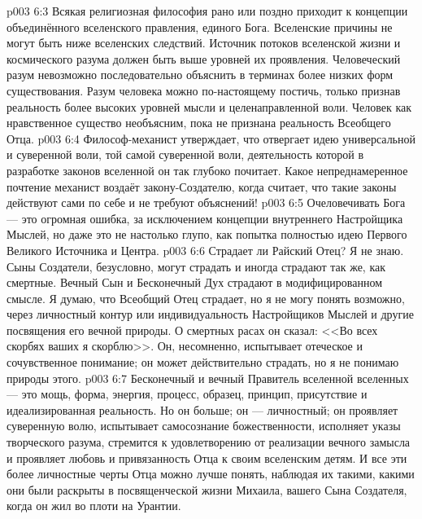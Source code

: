 \vs p003 6:3 \pc Всякая религиозная философия рано или поздно приходит к концепции объединённого вселенского правления, единого Бога. Вселенские причины не могут быть ниже вселенских следствий. Источник потоков вселенской жизни и космического разума должен быть выше уровней их проявления. Человеческий разум невозможно последовательно объяснить в терминах более низких форм существования. Разум человека можно по\hyp{}настоящему постичь, только признав реальность более высоких уровней мысли и целенаправленной воли. Человек как нравственное существо необъясним, пока не признана реальность Всеобщего Отца.
\vs p003 6:4 Философ\hyp{}механист утверждает, что отвергает идею универсальной и суверенной воли, той самой суверенной воли, деятельность которой в разработке законов вселенной он так глубоко почитает. Какое непреднамеренное почтение механист воздаёт закону\hyp{}Создателю, когда считает, что такие законы действуют сами по себе и не требуют объяснений!
\vs p003 6:5 Очеловечивать Бога --- это огромная ошибка, за исключением концепции внутреннего Настройщика Мыслей, но даже это не настолько глупо, как попытка полностью  идею Первого Великого Источника и Центра.
\vs p003 6:6 \pc Страдает ли Райский Отец? Я не знаю. Сыны Создатели, безусловно, могут страдать и иногда страдают так же, как смертные. Вечный Сын и Бесконечный Дух страдают в модифицированном смысле. Я думаю, что Всеобщий Отец страдает, но я не могу понять  возможно, через личностный контур или индивидуальность Настройщиков Мыслей и другие посвящения его вечной природы. О смертных расах он сказал: <<Во всех скорбях ваших я скорблю>>. Он, несомненно, испытывает отеческое и сочувственное понимание; он может действительно страдать, но я не понимаю природы этого.
\vs p003 6:7 \pc Бесконечный и вечный Правитель вселенной вселенных --- это мощь, форма, энергия, процесс, образец, принцип, присутствие и идеализированная реальность. Но он больше; он --- личностный; он проявляет суверенную волю, испытывает самосознание божественности, исполняет указы творческого разума, стремится к удовлетворению от реализации вечного замысла и проявляет любовь и привязанность Отца к своим вселенским детям. И все эти более личностные черты Отца можно лучше понять, наблюдая их такими, какими они были раскрыты в посвященческой жизни Михаила, вашего Сына Создателя, когда он жил во плоти на Урантии.
